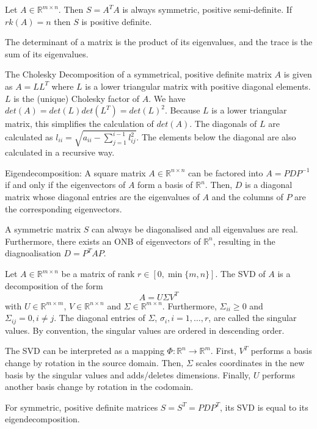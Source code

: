 Let $A \in \mathbb{R}^{m \times n}$.
Then $S = A^T A$ is always symmetric, positive semi-definite. If $rk(A) = n$ then $S$ is positive definite.

The determinant of a matrix is the product of its eigenvalues, and the trace is the sum of its eigenvalues.

The Cholesky Decomposition of a symmetrical, positive definite matrix $A$ is given as
$A = L L^T$ where $L$ is a lower triangular matrix with positive diagonal elements.
$L$ is the (unique) Cholesky factor of $A$.
We have $det(A) = det(L) det(L^T) = det(L)^2$.
Because $L$ is a lower triangular matrix, this simplifies the calculation of $det(A)$.
The diagonals of $L$ are calculated as
$l_{ii} = \sqrt{a_{ii} - \sum_{j = 1}^{i - 1}{l_{ij}^2}}$.
The elements below the diagonal are also calculated in a recursive way.

Eigendecomposition:
A square matrix $A \in \mathbb{R}^{n \times n}$ can be factored into
$A = P D P^{-1}$
if and only if the eigenvectors of $A$ form a basis of $\mathbb{R}^n$.
Then, $D$ is a diagonal matrix whose diagonal entries
are the eigenvalues of $A$ and the columns of $P$
are the corresponding eigenvectors.

A symmetric matrix $S$ can always be diagonalised and all eigenvalues are real.
Furthermore, there exists an ONB of eigenvectors of $\mathbb{R}^n$, resulting in the diagnoalisation $D = P^T A P$.

Let $A \in \mathbb{R}^{m \times n}$ be a matrix of rank $r \in [0, \min\{m, n\}]$.
The SVD of $A$ is a decomposition of the form
\begin{equation*}
    A = U \Sigma V^T
\end{equation*}
with $U \in \mathbb{R}^{m \times m}$, $V \in \mathbb{R}^{n \times n}$ and $\Sigma \in \mathbb{R}^{m \times n}$.
Furthermore, $\Sigma_{ii} \geq 0$ and $\Sigma_{ij} = 0, i \neq j$.
The diagonal entries of $\Sigma$, $\sigma_i, i = 1, \dotsc, r$, are called the singular values.
By convention, the singular values are ordered in descending order.

The SVD can be interpreted as a mapping $\Phi : \mathbb{R}^n \to \mathbb{R}^m$.
First, $V^T$ performs a basis change by rotation in the source domain.
Then, $\Sigma$ scales coordinates in the new basis by the singular values and adds/deletes dimensions.
Finally, $U$ performs another basis change by rotation in the codomain.

For symmetric, positive definite matrices $S = S^T = P D P^T$, its SVD is equal to its eigendecomposition.

